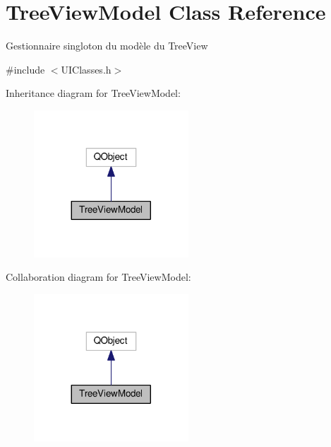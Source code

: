 \hypertarget{class_tree_view_model}{}\section{Tree\+View\+Model Class Reference}
\label{class_tree_view_model}


Gestionnaire singloton du modèle du Tree\+View~\newline
  




{\ttfamily \#include $<$U\+I\+Classes.\+h$>$}



Inheritance diagram for Tree\+View\+Model\+:\nopagebreak
\begin{figure}[H]
\begin{center}
\leavevmode
\includegraphics[width=164pt]{class_tree_view_model__inherit__graph}
\end{center}
\end{figure}


Collaboration diagram for Tree\+View\+Model\+:\nopagebreak
\begin{figure}[H]
\begin{center}
\leavevmode
\includegraphics[width=164pt]{class_tree_view_model__coll__graph}
\end{center}
\end{figure}
